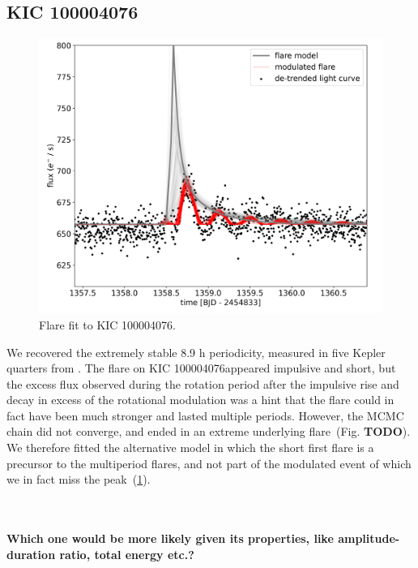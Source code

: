 \documentclass[fleqn,usenatbib,letters]{mnras}%
\newcommand{\FE}{KIC 100004076} %
\begin{document}
\subsection{\FE}
\begin{figure}
	\includegraphics[width=\columnwidth]{figures/04_08_2020_14_26_KIC100004076_flarefit_50retrievals.png}
    \caption{Flare fit to \FE.}
    \label{fig:fit\FE}
\end{figure}
We recovered the extremely stable 8.9 h periodicity, measured in five Kepler quarters from \citep{gizis2013}. The flare on \FE appeared impulsive and short, but the excess flux observed during the rotation period after the impulsive rise and decay in excess of the rotational modulation was a hint that the flare could in fact have been much stronger and lasted multiple periods. However, the MCMC chain did not converge, and ended in an extreme underlying flare~(Fig. \textbf{TODO}). We therefore fitted the alternative model in which the short first flare is a precursor to the multiperiod flares, and not part of the modulated event of which we in fact miss the peak~(\ref{fig:fit\FE}).

\\
\\
\textbf{Which one would be more likely given its properties, like amplitude-duration ratio, total energy etc.?}
\end{document}
